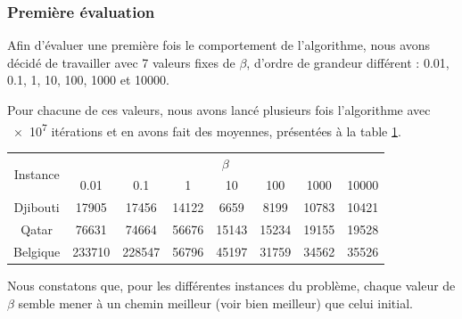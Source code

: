 \documentclass[a4paper, 12pt]{report}
\begin{document}
    \subsubsection{Première évaluation}
    Afin d'évaluer une première fois le comportement de l'algorithme, nous avons décidé de travailler avec 7 valeurs fixes de $\beta$, d'ordre de grandeur différent : \num{0.01}, \num{0.1}, \num{1}, \num{10}, \num{100}, \num{1000} et \num{10000}.\par
    Pour chacune de ces valeurs, nous avons lancé plusieurs fois l'algorithme avec \num{e7} itérations et en avons fait des moyennes, présentées à la table \ref{tab:beta_for_random}.\par
    \begin{table}[H]
    	\centering
    	\begin{tabular}{|c|c|c|c|c|c|c|c|}
    	\hline
    		\multirow{2}{*}{Instance} & \multicolumn{7}{c|}{$\beta$} \\ \cline{2-8}
    		 & \num{0.01} & \num{0.1} & \num{1} & \num{10} & \num{100} & \num{1000} & \num{10000}\\ \hline
    		\hline
    		Djibouti & \num{17905} & \num{17456} & \num{14122} & \num{6659} & \num{8199} & \num{10783} & \num{10421}\\ \hline
    		Qatar & \num{76631} & \num{74664} & \num{56676} & \num{15143} & \num{15234} & \num{19155} & \num{19528}\\ \hline
    		Belgique & \num{233710} & \num{228547} & \num{56796} & \num{45197} & \num{31759} & \num{34562} & \num{35526}\\ \hline
    	\end{tabular}
    	\label{tab:beta_for_random}
    \end{table}
    Nous constatons que, pour les différentes instances du problème, chaque valeur de $\beta$ semble mener à un chemin meilleur (voir bien meilleur) que celui initial.
\end{document}
